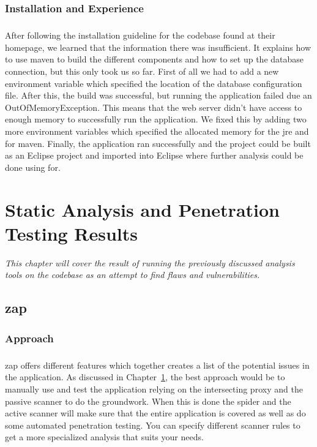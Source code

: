 \documentclass[11pt,english,a4paper]{report}
\begin{document}
\subsection{Installation and Experience}
\paragraph{}
After following the installation guideline for the codebase found at their homepage, we learned that the information there was insufficient.
It explains how to use \gls{maven} to build the different components and how to set up the database connection, but this only took us so far.
First of all we had to add a new environment variable which specified the location of the database configuration file.
After this, the build was successful, but running the application failed due an OutOfMemoryException. 
This means that the web server didn't have access to enough memory to successfully run the application. 
We fixed this by adding two more environment variables which specified the allocated memory for the \gls{jre} and for \gls{maven}.
Finally, the application ran successfully and the project could be built as an Eclipse project and imported into Eclipse where further analysis could be done using \gls{for}.




\chapter{Static Analysis and Penetration Testing Results}
\label{cha:part2}
\textit{This chapter will cover the result of running the previously discussed analysis tools on the codebase as an attempt to find flaws and vulnerabilities.}

\section{\gls{zap}}
\subsection{Approach}
\paragraph{}
\gls{zap} offers different features which together creates a list of the potential issues in the application. 
As discussed in Chapter~\ref{cha:part2}, the best approach would be to manually use and test the application relying on the intersecting proxy and the passive scanner to do the groundwork. 
When this is done the spider and the active scanner will make sure that the entire application is covered as well as do some automated penetration testing. 
You can specify different scanner rules to get a more specialized analysis that suits your needs.
\end{document}
